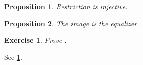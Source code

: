 \documentclass{article}
\newtheorem{proposition}{Proposition}
\newtheorem{exercise}{Exercise}
\begin{document}
\begin{proposition}
  \label{prop:chap:sheaves:sec:intro:injectivity of restriction maps}
  Restriction is injective.
\end{proposition}
\begin{proposition}
  \label{prop:chap:sheaves:sec:intro:image of restriction maps}
  The image is the equalizer.
\end{proposition}
\begin{exercise}
  \label{exercise:chap:sheaves:sec:intro:complete proof representables are sheaves}
  Prove
  .
\end{exercise}
See
\cref{exercise:chap:sheaves:sec:intro:complete proof representables are sheaves}.
\end{document}
